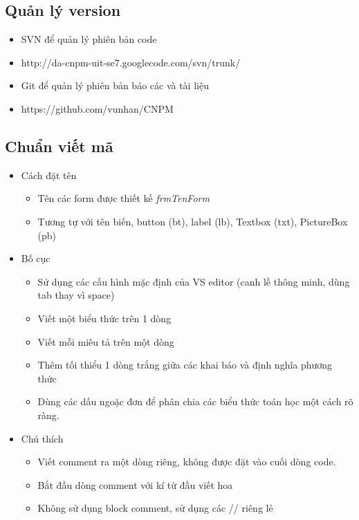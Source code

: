 \documentclass{article}
\begin{document}
			\subsection{Quản lý version}
			
				\begin{itemize}
					\item SVN để quản lý phiên bản code
					\item http://da-cnpm-uit-se7.googlecode.com/svn/trunk/
					\item Git để quản lý phiên bản báo các và tài liệu
					\item https://github.com/vunhan/CNPM
				\end{itemize}
			
			\subsection{Chuẩn viết mã}
			
				\begin{itemize}
					\item Cách đặt tên
					
						\begin{itemize}
							\item Tên các form được thiết kế \textit{frmTenForm}
							\item Tương tự với tên biến, button (bt), label (lb), Textbox (txt), PictureBox (pb)
						\end{itemize}
					\newpage
					\item Bố cục
					
						\begin{itemize}
							\item Sử dụng các cấu hình mặc định của VS editor (canh lề thông minh, dùng tab thay vì space)
							\item Viết một biểu thức trên 1 dòng
							\item Viết mỗi miêu tả trên một dòng
							\item Thêm tối thiểu 1 dòng trắng giữa các khai báo và định nghĩa phương thức 
							\item Dùng các dấu ngoặc đơn để phân chia các biểu thức toán học một cách rõ ràng.
						\end{itemize}
					
					\item Chú thích
					
						\begin{itemize}
							\item Viết comment ra một dòng riêng, không được đặt vào cuối dòng code.
							\item Bắt đầu dòng comment với kí từ đầu viết hoa
							\item Không sử dụng block comment, sử dụng các // riêng lẻ
						\end{itemize}
				\end{itemize}
			
\end{document}
